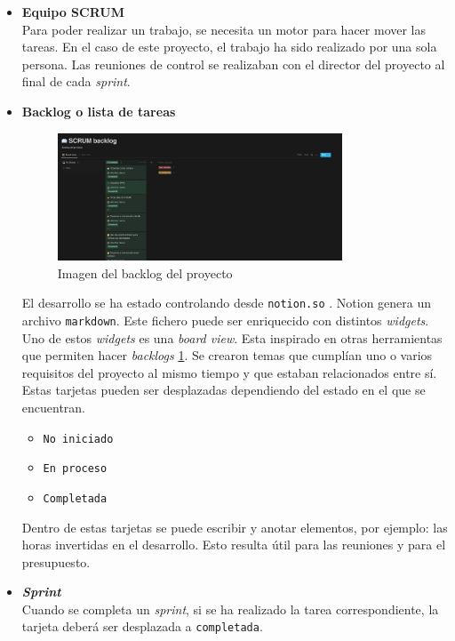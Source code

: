 \begin{itemize}
    \item \textbf{Equipo SCRUM}\\
    Para poder realizar un trabajo, se necesita un motor para hacer mover las tareas.
    En el caso de este proyecto, el trabajo ha sido realizado por una sola persona. Las reuniones de control se realizaban con el director del proyecto al final de cada \textit{sprint}.
    \item \textbf{Backlog o lista de tareas}\\
    \begin{figure}[H]
        \centering
        \includegraphics[width=0.8\textwidth]{Figures/Screenshot_20220601_182542.png}
        \caption{Imagen del backlog del proyecto}
        \label{fg:backlog}
    \end{figure}
    El desarrollo se ha estado controlando desde \verb|notion.so| \cite{web:notion}. Notion genera un archivo \verb|markdown|. Este fichero puede ser enriquecido con distintos \textit{widgets}. Uno de estos \textit{widgets} es una \textit{board view}. Esta inspirado en otras herramientas que permiten hacer \textit{backlogs} \ref{fg:backlog}.
    Se crearon temas que cumplían uno o varios requisitos del proyecto al mismo tiempo y que estaban relacionados entre sí. Estas tarjetas pueden ser desplazadas dependiendo del estado en el que se encuentran.
    \begin{itemize}
        \item \verb|No iniciado|
        \item \verb|En proceso|
        \item \verb|Completada|
    \end{itemize}
    Dentro de estas tarjetas se puede escribir y anotar elementos, por ejemplo: las horas invertidas en el desarrollo. Esto resulta útil para las reuniones y para el presupuesto.
    \item \textbf{\textit{Sprint}}\\
    Cuando se completa un \textit{sprint}, si se ha realizado la tarea correspondiente, la tarjeta deberá ser desplazada a \verb|completada|.

\end{itemize}

